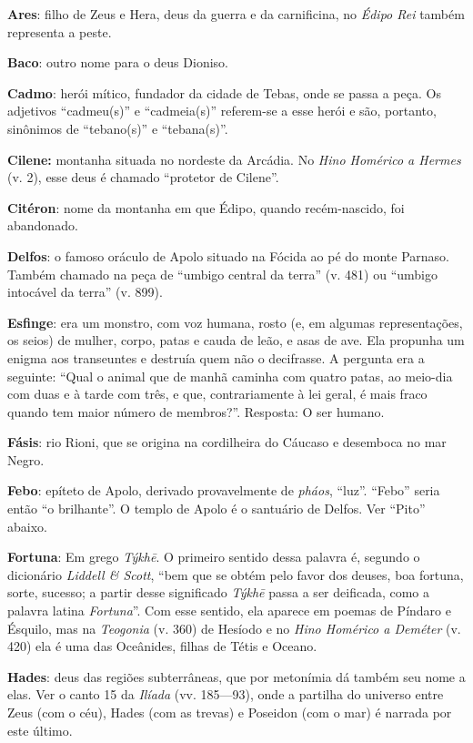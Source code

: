 \textbf{Ares}: filho de Zeus e Hera, deus da guerra e da carnificina,
no \emph{Édipo Rei} também representa a peste.

\textbf{Baco}: outro nome para o deus Dioniso.

\textbf{Cadmo}: herói mítico, fundador da cidade de Tebas, onde se
passa a peça. Os adjetivos ``cadmeu(s)'' e ``cadmeia(s)'' referem-se a
esse herói e são, portanto, sinônimos de ``tebano(s)'' e ``tebana(s)''.

\textbf{Cilene:} montanha situada no nordeste da Arcádia. No
\emph{Hino Homérico a Hermes} (v. 2), esse deus é chamado ``protetor de
Cilene''.

\textbf{Citéron}: nome da montanha em que Édipo, quando
recém-nascido, foi abandonado.

\textbf{Delfos}: o famoso oráculo de Apolo situado na Fócida ao pé do
monte Parnaso. Também chamado na peça de ``umbigo central da terra'' (v.
481) ou ``umbigo intocável da terra'' (v. 899).

\textbf{Esfinge}: era um monstro, com voz humana, rosto (e, em
algumas representações, os seios) de mulher, corpo, patas e cauda de
leão, e asas de ave. Ela propunha um enigma aos transeuntes e destruía
quem não o decifrasse. A pergunta era a seguinte: ``Qual o animal que de
manhã caminha com quatro patas, ao meio-dia com duas e à tarde com três,
e que, contrariamente à lei geral, é mais fraco quando tem maior número
de membros?''. Resposta: O ser humano.

\textbf{Fásis}: rio Rioni, que se origina na cordilheira do Cáucaso
e desemboca no mar Negro.

\textbf{Febo}: epíteto de Apolo, derivado provavelmente de
\emph{pháos}, ``luz''. ``Febo'' seria então ``o brilhante''. O templo de
Apolo é o santuário de Delfos. Ver ``Pito'' abaixo.

\textbf{Fortuna}: Em grego \emph{Týkhē}. O primeiro sentido dessa
palavra é, segundo o dicionário \emph{Liddell \& Scott}, ``bem que se
obtém pelo favor dos deuses, boa fortuna, sorte, sucesso; a partir desse
significado \emph{Týkhē} passa a ser deificada, como a palavra latina
\emph{Fortuna}''. Com esse sentido, ela aparece em poemas de Píndaro e
Ésquilo, mas na \emph{Teogonia} (v. 360) de Hesíodo e no \emph{Hino
Homérico a Deméter} (v. 420) ela é uma das Oceânides, filhas de Tétis e
Oceano.

\textbf{Hades}: deus das regiões subterrâneas, que por metonímia dá
também seu nome a elas. Ver o canto 15 da \emph{Ilíada} (vv. 185---93),
onde a partilha do universo entre Zeus (com o céu), Hades (com as
trevas) e Poseidon (com o mar) é narrada por este último.


